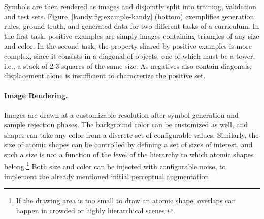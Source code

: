 %
Symbols are then rendered as images and disjointly split into training, validation and test sets.
Figure~\ref{kandy:fig:example-kandy} (bottom) exemplifies generation rules, ground truth, and generated data for two different tasks of a curriculum. In the first task, positive examples are simply images containing triangles of any size and color. In the second task, the property shared by positive examples is more complex, since it consists in a diagonal of objects, one of which must be a tower, i.e., a stack of 2-3 squares of the same size. As negatives also contain diagonals, displacement alone is insufficient to characterize the positive set.



\paragraph{Image Rendering.}
%
%
Images are drawn at a customizable resolution after symbol generation and sample rejection phases. The background color can be customized as well, and shapes can take any color from a discrete set of configurable values.
%
Similarly, the size of atomic shapes can be controlled by defining a set of sizes of interest, and such a size is not a function of the level of the hierarchy to which atomic shapes belong.\footnote{If the drawing area is too small to draw an atomic shape, overlaps can happen in crowded or highly hierarchical scenes.}
%
Both size and color can be injected with configurable noise, to implement the already mentioned initial perceptual augmentation.

